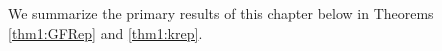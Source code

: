 \documentclass[../dissertation.tex]{subfiles}
\begin{document}



We summarize the primary results of this chapter below in Theorems
\ref{thm1:GFRep} and \ref{thm1:krep}.
\end{document}
